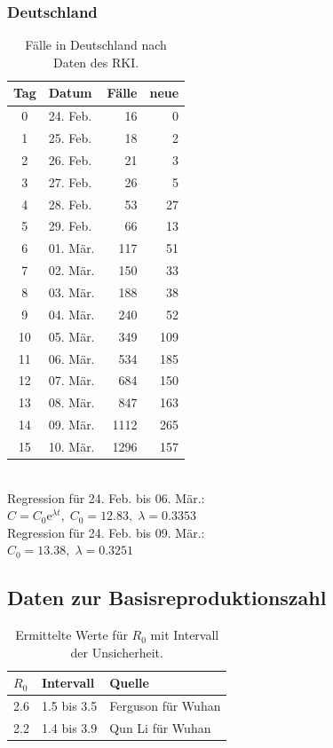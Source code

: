 \documentclass[a4paper,11pt,fleqn,twocolumn,twoside,dvipdfmx]{scrartcl}
\numberwithin{equation}{section}
\newcommand{\ee}{\mathrm e}
\newcommand{\strong}[1]{\textbf{#1}}
\begin{document}
\subsubsection*{Deutschland}
\vspace{-6mm}
\begin{table}[h]
\caption{Fälle in Deutschland\newline
nach Daten des RKI.}
\begin{tabular}{clrr}
\toprule
\strong{Tag} & \strong{Datum} & \strong{Fälle} & \strong{neue}\\
\midrule
0 & 24. Feb. & 16 & 0\\
1 & 25. Feb. & 18 & 2\\
2 & 26. Feb. & 21 & 3\\
3 & 27. Feb. & 26 & 5\\
4 & 28. Feb. & 53 & 27\\
5 & 29. Feb. & 66 & 13\\
6 & 01. Mär. & 117 & 51\\
7 & 02. Mär. & 150 & 33\\
8 & 03. Mär. & 188 & 38\\
9 & 04. Mär. & 240 & 52\\
10 & 05. Mär. & 349 & 109\\
11 & 06. Mär. & 534 & 185\\
12 & 07. Mär. & 684 & 150\\
13 & 08. Mär. & 847 & 163\\
14 & 09. Mär. & 1112 & 265\\
15 & 10. Mär. & 1296 & 157\\
\bottomrule
\end{tabular}\\[6pt]
Regression für 24. Feb. bis 06. Mär.:\\
$C = C_0\ee^{\lambda t},\; C_0=12.83,\; \lambda=0.3353$\\[4pt]
Regression für 24. Feb. bis 09. Mär.:\\
$C_0=13.38,\;\lambda=0.3251$
\vspace{-4em}
\end{table}

\newpage
\subsection{Daten zur Basisreproduktionszahl}
\vspace{-6mm}
\begin{table}[h]
\caption{Ermittelte Werte für $R_0$ mit\newline
Intervall der Unsicherheit.}
\begin{tabular}{lll}
\toprule
$R_0$ & Intervall & Quelle\\
\midrule
2.6 & 1.5 bis 3.5 & Ferguson für Wuhan \cite{Ferguson}\\
2.2 & 1.4 bis 3.9 & Qun Li für Wuhan \cite{QunLi}\\
\bottomrule
\end{tabular}
\end{table}
\end{document}
